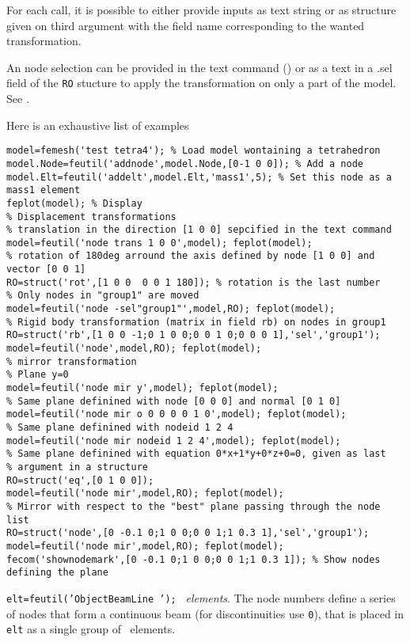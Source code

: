 For each call, it is possible to either provide inputs as text string or as structure given on third argument with the field name corresponding to the wanted transformation. 

An node selection can be provided in the text command () or as a text in a {.sel} field of the {\tt RO} stucture to apply the transformation on only a part of the model. See .

Here is an exhaustive list of examples

\begin{verbatim}
model=femesh('test tetra4'); % Load model wontaining a tetrahedron
model.Node=feutil('addnode',model.Node,[0-1 0 0]); % Add a node
model.Elt=feutil('addelt',model.Elt,'mass1',5); % Set this node as a mass1 element
feplot(model); % Display
% Displacement transformations
% translation in the direction [1 0 0] sepcified in the text command
model=feutil('node trans 1 0 0',model); feplot(model); 
% rotation of 180deg arround the axis defined by node [1 0 0] and vector [0 0 1]
RO=struct('rot',[1 0 0  0 0 1 180]); % rotation is the last number
% Only nodes in "group1" are moved
model=feutil('node -sel"group1"',model,RO); feplot(model); 
% Rigid body transformation (matrix in field rb) on nodes in group1
RO=struct('rb',[1 0 0 -1;0 1 0 0;0 0 1 0;0 0 0 1],'sel','group1');
model=feutil('node',model,RO); feplot(model); 
% mirror transformation
% Plane y=0
model=feutil('node mir y',model); feplot(model); 
% Same plane definined with node [0 0 0] and normal [0 1 0]
model=feutil('node mir o 0 0 0 0 1 0',model); feplot(model); 
% Same plane definined with nodeid 1 2 4
model=feutil('node mir nodeid 1 2 4',model); feplot(model);
% Same plane definined with equation 0*x+1*y+0*z+0=0, given as last
% argument in a structure
RO=struct('eq',[0 1 0 0]);
model=feutil('node mir',model,RO); feplot(model);
% Mirror with respect to the "best" plane passing through the node list 
RO=struct('node',[0 -0.1 0;1 0 0;0 0 1;1 0.3 1],'sel','group1');
model=feutil('node mir',model,RO); feplot(model); 
fecom('shownodemark',[0 -0.1 0;1 0 0;0 0 1;1 0.3 1]); % Show nodes defining the plane
\end{verbatim}


{\tt elt=feutil('ObjectBeamLine ');}
\beam\ {\sl elements}.  The node numbers  define a series of nodes that form a continuous beam (for discontinuities use {\tt 0}), that is placed in {\tt elt} as a single group of \beam\ elements.


